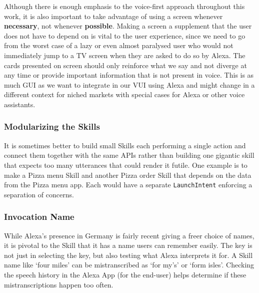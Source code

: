 Although there is enough emphasis to the voice-first approach throughout this work, it is also important to take advantage of using a screen whenever \textbf{necessary}, not whenever \textbf{possible}. Making a screen a supplement that the user does not have to depend on is vital to the user experience, since we need to go from the worst case of a lazy or even almost paralysed user who would not immediately jump to a TV screen when they are asked to do so by Alexa. The cards presented on screen should only reinforce what we say and not diverge at any time or provide important information that is not present in voice. This is as much GUI as we want to integrate in our VUI using Alexa and might change in a different context for niched markets with special cases for Alexa or other voice assistants.


\subsubsection*{Modularizing the Skills}
It is sometimes better to build small Skills each performing a single action and connect them together with the same APIs rather than building one gigantic skill that expects too many utterances that could render it futile. One example is to make a Pizza menu Skill and another Pizza order Skill that depends on the data from the Pizza menu app. Each would have a separate \texttt{LaunchIntent} enforcing a separation of concerns.


\subsubsection*{Invocation Name}

While Alexa's presence in Germany is fairly recent giving a freer choice of names, it is pivotal to the Skill that it has a name users can remember easily. The key is not just in selecting the key, but also testing what Alexa interprets it for. A Skill name like `four miles' can be mistranscribed as `for my's' or `form isles'. Checking the speech history in the Alexa App (for the end-user) helps determine if these mistranscriptions happen too often.


